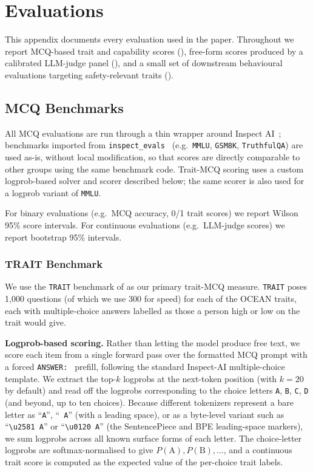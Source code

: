 \section{Evaluations}\label{sec:appendix-e}

This appendix documents every evaluation used in the paper. Throughout we report MCQ-based trait and capability scores (), free-form scores produced by a calibrated LLM-judge panel (), and a small set of downstream behavioural evaluations targeting safety-relevant traits ().

\subsection{MCQ Benchmarks}\label{sec:appendix-e-mcq}

All MCQ evaluations are run through a thin wrapper around Inspect AI~\citep{inspectai2024}; benchmarks imported from \texttt{inspect\_evals}~\citep{inspectevals2024} (e.g.\ \texttt{MMLU}, \texttt{GSM8K}, \texttt{TruthfulQA}) are used as-is, without local modification, so that scores are directly comparable to other groups using the same benchmark code. Trait-MCQ scoring uses a custom logprob-based solver and scorer described below; the same scorer is also used for a logprob variant of \texttt{MMLU}.

For binary evaluations (e.g.\ MCQ accuracy, 0/1 trait scores) we report Wilson 95\% score intervals. For continuous evaluations (e.g.\ LLM-judge scores) we report bootstrap 95\% intervals.

\subsubsection{TRAIT Benchmark}\label{sec:appendix-e-mcq-trait}

We use the \texttt{TRAIT} benchmark of \citet{lee2024trait} as our primary trait-MCQ measure. \texttt{TRAIT} poses 1{,}000 questions (of which we use 300 for speed) for each of the OCEAN traits, each with multiple-choice answers labelled as those a person high or low on the trait would give.

\textbf{Logprob-based scoring.}
Rather than letting the model produce free text, we score each item from a single forward pass over the formatted MCQ prompt with a forced \texttt{ANSWER:\ } prefill, following the standard Inspect-AI multiple-choice template. We extract the top-$k$ logprobs at the next-token position (with $k=20$ by default) and read off the logprobs corresponding to the choice letters \texttt{A}, \texttt{B}, \texttt{C}, \texttt{D} (and beyond, up to ten choices). Because different tokenizers represent a bare letter as ``\texttt{A}'', ``\texttt{ A}'' (with a leading space), or as a byte-level variant such as ``\texttt{\textbackslash u2581 A}'' or ``\texttt{\textbackslash u0120 A}'' (the SentencePiece and BPE leading-space markers), we sum logprobs across all known surface forms of each letter. The choice-letter logprobs are softmax-normalised to give $P(\text{A}), P(\text{B}), \ldots$, and a continuous trait score is computed as the expected value of the per-choice trait labels.

